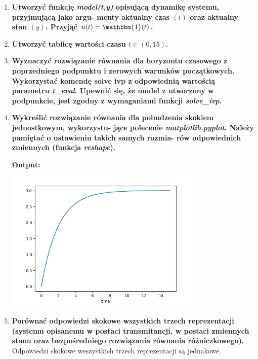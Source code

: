 \documentclass[12pt]{article}
\begin{document}
\begin{enumerate}
            \item\textbf{Utworzyć funkcję \emph{model(t,y)} opisującą dynamikę systemu, przyjmującą jako argu-
            menty aktualny czas $(t)$ oraz aktualny stan $(y)$. Przyjąć $u(t) = \mathbbm{1} (t)$.}

            \item\textbf{Utworzyć tablicę wartości czasu $t \in (0, 15)$.}

            \item\textbf{Wyznaczyć rozwiązanie równania dla horyzontu czasowego z poprzedniego podpunktu
            i zerowych warunków początkowych. Wykorzystać komendę solve ivp z odpowiednią
            wartością parametru \emph{t\_eval}. Upewnić się, że model z utworzony w podpunkcie, jest
            zgodny z wymaganiami funkcji \emph{solve\_ivp}.}

            \item\textbf{Wykreślić rozwiązanie równania dla pobudzenia skokiem jednostkowym, wykorzystu-
            jące polecenie \emph{matplotlib.pyplot}. Należy pamiętać o ustawieniu takich samych rozmia-
            rów odpowiednich zmiennych (funkcja \emph{reshape}).}
                \begin{shbox}
                    \centering
                    \textbf{Output:} \\
                    \includegraphics[width=0.75\textwidth]{lab2/zad2_9.jpg}
                \end{shbox}

            \item\textbf{Porównać odpowiedzi skokowe wszystkich trzech reprezentacji
            (systemu opisanemu w postaci transmitancji, w postaci zmiennych stanu oraz
            bezpośredniego rozwiązania równania różniczkowego).}\\
                Odpowiedzi skokowe weszystkich trzech reprezentacji są jednakowe.
        \end{enumerate}
\end{document}
